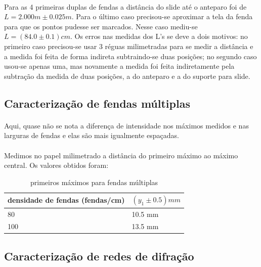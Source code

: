 \documentclass[a4paper,11pt]{article}
\begin{document}
\paragraph{}Para as 4 primeiras duplas de fendas a distância
do slide até o anteparo foi de $L = 2.000m \pm 0.025m$. 
Para o último caso precisou-se aproximar a tela da fenda
para que os pontos pudesse ser marcados. Nesse caso mediu-se
$L = (84.0 \pm 0.1)cm $. Os erros nas medidas dos L's se deve a dois motivos:
no primeiro caso precisou-se usar 3 réguas milimetradas para se 
medir a distância e a medida foi feita de forma indireta
subtraindo-se duas posições; no segundo caso usou-se apenas uma, mas
novamente a medida foi feita indiretamente pela subtração da medida
de duas posições, a do anteparo e a do suporte para 
slide. 



\subsection{Caracterização de fendas múltiplas}

\paragraph{}Aqui, quase não se nota a diferença de
intensidade nos máximos medidos e nas  larguras de fendas e
elas são mais igualmente espaçadas.



\paragraph{} Medimos no papel milimetrado a distância do
primeiro máximo ao máximo central. Os valores obtidos foram:
\begin{table}[!htp]
    \centering
    	\begin{tabular}{|l|l|}\hline
   		densidade de fendas (fendas/cm) & $(y_{1} \pm 0.5)mm$ \\ \hline
		80	& 10.5 mm  \\ \hline
		100	& 13.5  mm\\ \hline

	\end{tabular}
  \caption{primeiros máximos para fendas múltiplas}
\label{tab:multiplas}
\end{table}


\subsection{Caracterização de redes de difração}
\end{document}
